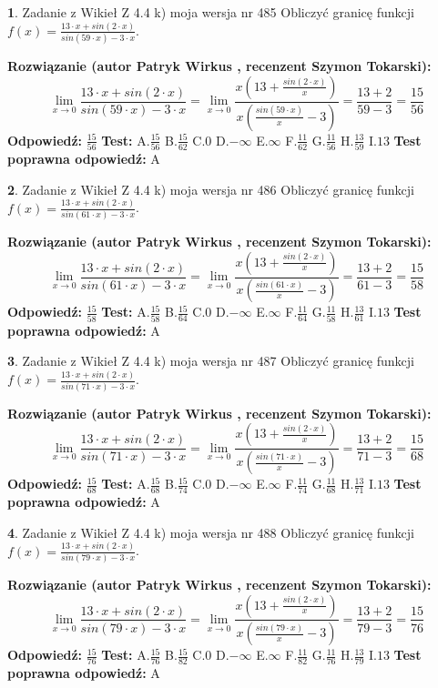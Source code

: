 \documentclass[12pt, a4paper]{article}
\theoremstyle{definition} %
\newtheorem{zad}{}
\newcommand{\zadStart}[1]{\begin{zad}#1\newline}
\newcommand{\zadStop}{\end{zad}}
\newcommand{\rozwStart}[2]{\noindent \textbf{Rozwiązanie (autor #1 , recenzent #2): }\newline}
\newcommand{\rozwStop}{\newline}
\newcommand{\odpStart}{\noindent \textbf{Odpowiedź:}\newline}
\newcommand{\odpStop}{\newline}
\newcommand{\testStart}{\noindent \textbf{Test:}\newline}
\newcommand{\testStop}{\newline}
\newcommand{\kluczStart}{\noindent \textbf{Test poprawna odpowiedź:}\newline}
\newcommand{\kluczStop}{\newline}
\begin{document}
\zadStart{Zadanie z Wikieł Z 4.4 k) moja wersja nr 485}
Obliczyć granicę funkcji $f(x)=\frac{13\cdot x +sin(2\cdot x)}{sin(59\cdot x) -3\cdot x}$.
\zadStop
\rozwStart{Patryk Wirkus}{Szymon Tokarski}
$$\lim\limits_{x\to 0}\frac{13\cdot x +sin(2\cdot x)}{sin(59\cdot x) -3\cdot x}
=\lim\limits_{x\to 0}\frac{x(13+\frac{sin(2\cdot x)}{x})}{x(\frac{sin(59\cdot x)}{x}-3)}
=\frac{13+2}{59-3} = \frac{15}{56}$$
\rozwStop
\odpStart
$\frac{15}{56}$
\odpStop
\testStart
A.$\frac{15}{56}$
B.$\frac{15}{62}$
C.$0$
D.$-\infty$
E.$\infty$
F.$\frac{11}{62}$
G.$\frac{11}{56}$
H.$\frac{13}{59}$
I.$13$
\testStop
\kluczStart
A
\kluczStop



\zadStart{Zadanie z Wikieł Z 4.4 k) moja wersja nr 486}
Obliczyć granicę funkcji $f(x)=\frac{13\cdot x +sin(2\cdot x)}{sin(61\cdot x) -3\cdot x}$.
\zadStop
\rozwStart{Patryk Wirkus}{Szymon Tokarski}
$$\lim\limits_{x\to 0}\frac{13\cdot x +sin(2\cdot x)}{sin(61\cdot x) -3\cdot x}
=\lim\limits_{x\to 0}\frac{x(13+\frac{sin(2\cdot x)}{x})}{x(\frac{sin(61\cdot x)}{x}-3)}
=\frac{13+2}{61-3} = \frac{15}{58}$$
\rozwStop
\odpStart
$\frac{15}{58}$
\odpStop
\testStart
A.$\frac{15}{58}$
B.$\frac{15}{64}$
C.$0$
D.$-\infty$
E.$\infty$
F.$\frac{11}{64}$
G.$\frac{11}{58}$
H.$\frac{13}{61}$
I.$13$
\testStop
\kluczStart
A
\kluczStop



\zadStart{Zadanie z Wikieł Z 4.4 k) moja wersja nr 487}
Obliczyć granicę funkcji $f(x)=\frac{13\cdot x +sin(2\cdot x)}{sin(71\cdot x) -3\cdot x}$.
\zadStop
\rozwStart{Patryk Wirkus}{Szymon Tokarski}
$$\lim\limits_{x\to 0}\frac{13\cdot x +sin(2\cdot x)}{sin(71\cdot x) -3\cdot x}
=\lim\limits_{x\to 0}\frac{x(13+\frac{sin(2\cdot x)}{x})}{x(\frac{sin(71\cdot x)}{x}-3)}
=\frac{13+2}{71-3} = \frac{15}{68}$$
\rozwStop
\odpStart
$\frac{15}{68}$
\odpStop
\testStart
A.$\frac{15}{68}$
B.$\frac{15}{74}$
C.$0$
D.$-\infty$
E.$\infty$
F.$\frac{11}{74}$
G.$\frac{11}{68}$
H.$\frac{13}{71}$
I.$13$
\testStop
\kluczStart
A
\kluczStop



\zadStart{Zadanie z Wikieł Z 4.4 k) moja wersja nr 488}
Obliczyć granicę funkcji $f(x)=\frac{13\cdot x +sin(2\cdot x)}{sin(79\cdot x) -3\cdot x}$.
\zadStop
\rozwStart{Patryk Wirkus}{Szymon Tokarski}
$$\lim\limits_{x\to 0}\frac{13\cdot x +sin(2\cdot x)}{sin(79\cdot x) -3\cdot x}
=\lim\limits_{x\to 0}\frac{x(13+\frac{sin(2\cdot x)}{x})}{x(\frac{sin(79\cdot x)}{x}-3)}
=\frac{13+2}{79-3} = \frac{15}{76}$$
\rozwStop
\odpStart
$\frac{15}{76}$
\odpStop
\testStart
A.$\frac{15}{76}$
B.$\frac{15}{82}$
C.$0$
D.$-\infty$
E.$\infty$
F.$\frac{11}{82}$
G.$\frac{11}{76}$
H.$\frac{13}{79}$
I.$13$
\testStop
\kluczStart
A
\kluczStop
\end{document}
